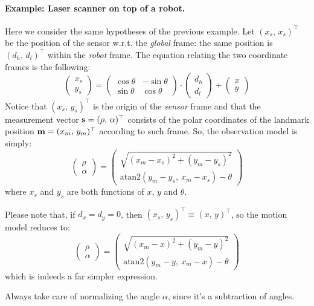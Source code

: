 	\paragraph{Example: Laser scanner on top of a robot.}
		Here we consider the same hypotheses of the previous example.
		Let $(x_s,\, x_s)^\top$ be the position of the sensor w.r.t. the \emph{global} frame: the same position is $(d_h,\, d_l)^\top$ within the \emph{robot} frame.
		The equation relating the two coordinate frames is the following:
		\begin{equation}
			\left(\begin{array}{c}
				x_s \\ y_s
			\end{array}\right)
			=
			\left(\begin{array}{ccc}
				\cos{\theta} & -\sin{\theta} \\
				\sin{\theta} & \cos{\theta}
			\end{array}\right)
			\cdot
			\left(\begin{array}{c}
				d_h \\ d_l
			\end{array}\right)
			+
			\left(\begin{array}{c}
				x \\ y
			\end{array}\right)
		\end{equation}
		Notice that $(x_s,\, y_s)^\top$ is the origin of the \emph{sensor} frame and that the measurement vector $\boldsymbol{\mathrm{{s}}} = (\rho,\, \alpha)^\top$ consists of the polar coordinates of the landmark position $\boldsymbol{\mathrm{{m}}} = (x_m,\, y_m)^\top$ according to such frame.
		So, the observation model is simply:
		\[
			\left(\begin{array}{c}
				\rho \\ \alpha
			\end{array}\right)
			=
			\left(\begin{array}{ccc}
				\sqrt{(x_m - x_s)^2 + (y_m - y_s)^2} \\
				\mathrm{atan2}(y_m - y_s,\ x_m - x_s) - \theta
			\end{array}\right)
		\]
		where $x_s$ and $y_s$ are both functions of $x$, $y$ and $\theta$.
		
		Please note that, if $d_x = d_y = 0$, then $(x_s,\, y_s)^\top \equiv (x,\, y)^\top$, so the motion model reduces to: 
		\[
			\left(\begin{array}{c}
				\rho \\ \alpha
			\end{array}\right)
			=
			\left(\begin{array}{ccc}
				\sqrt{(x_m - x)^2 + (y_m - y)^2} \\
				\mathrm{atan2}(y_m - y,\ x_m - x) - \theta
			\end{array}\right)
		\]
		which is indeeds a far simpler expression.
		
		\begin{important}
			Always take care of normalizing the angle $\alpha$, since it's a subtraction of angles.
		\end{important}